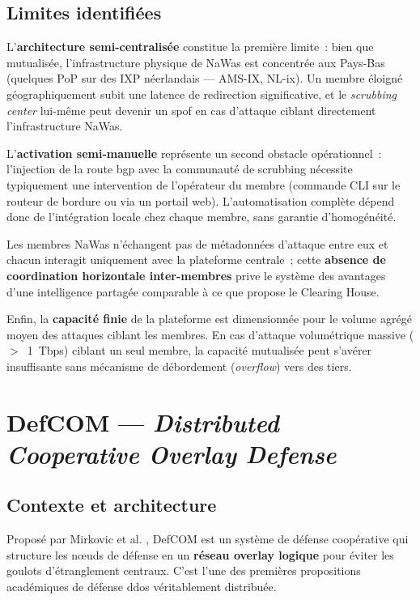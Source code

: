 \subsection{Limites identifiées}

L'\textbf{architecture semi-centralisée} constitue la première limite~: bien que mutualisée, l'infrastructure physique de NaWas est concentrée aux Pays-Bas (quelques PoP sur des IXP néerlandais --- AMS-IX, NL-ix). Un membre éloigné géographiquement subit une latence de redirection significative, et le \textit{scrubbing center} lui-même peut devenir un \gls{spof} en cas d'attaque ciblant directement l'infrastructure NaWas.

L'\textbf{activation semi-manuelle} représente un second obstacle opérationnel~: l'injection de la route \gls{bgp} avec la communauté de scrubbing nécessite typiquement une intervention de l'opérateur du membre (commande CLI sur le routeur de bordure ou via un portail web). L'automatisation complète dépend donc de l'intégration locale chez chaque membre, sans garantie d'homogénéité.

Les membres NaWas n'échangent pas de métadonnées d'attaque entre eux et chacun interagit uniquement avec la plateforme centrale~; cette \textbf{absence de coordination horizontale inter-membres} prive le système des avantages d'une intelligence partagée comparable à ce que propose le Clearing House.

Enfin, la \textbf{capacité finie} de la plateforme est dimensionnée pour le volume agrégé moyen des attaques ciblant les membres. En cas d'attaque volumétrique massive ($>$~1~Tbps) ciblant un seul membre, la capacité mutualisée peut s'avérer insuffisante sans mécanisme de débordement (\textit{overflow}) vers des tiers.

\section{DefCOM --- \textit{Distributed Cooperative Overlay Defense}}
\label{sec:defcom}

\subsection{Contexte et architecture}

Proposé par Mirkovic et al. \parencite{mirkovic2003defcom}, DefCOM est un système de défense coopérative qui structure les n\oe{}uds de défense en un \textbf{réseau overlay logique} pour éviter les goulots d'étranglement centraux. C'est l'une des premières propositions académiques de défense \gls{ddos} véritablement distribuée.


